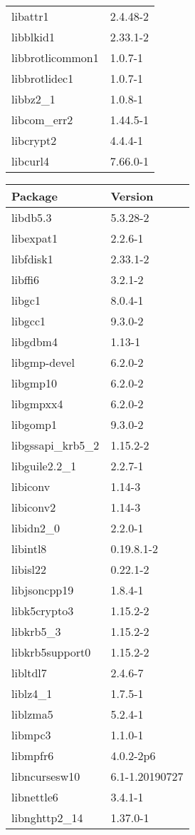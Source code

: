 \documentclass[10pt, english, openany]{report}
\begin{document}
\begin{appendices}
\begin{center}
\begin{tabular}{|m{4cm}|m{4cm}|}
libattr1 & 2.4.48-2 \\
libblkid1 & 2.33.1-2 \\
libbrotlicommon1 & 1.0.7-1 \\
libbrotlidec1 & 1.0.7-1 \\
libbz2\_1 & 1.0.8-1 \\
libcom\_err2 & 1.44.5-1 \\
libcrypt2 & 4.4.4-1 \\
libcurl4 & 7.66.0-1 \\
\hline
\end{tabular}
\begin{tabular}{|m{3cm}|m{3cm}|}
Package & Version \\
\hline
libdb5.3 & 5.3.28-2 \\
libexpat1 & 2.2.6-1 \\
libfdisk1 & 2.33.1-2 \\
libffi6 & 3.2.1-2 \\
libgc1 & 8.0.4-1 \\
libgcc1 & 9.3.0-2 \\
libgdbm4 & 1.13-1 \\
libgmp-devel & 6.2.0-2 \\
libgmp10 & 6.2.0-2 \\
libgmpxx4 & 6.2.0-2 \\
libgomp1 & 9.3.0-2 \\
libgssapi\_krb5\_2 & 1.15.2-2 \\
libguile2.2\_1 & 2.2.7-1 \\
libiconv & 1.14-3 \\
libiconv2 & 1.14-3 \\
libidn2\_0 & 2.2.0-1 \\
libintl8 & 0.19.8.1-2 \\
libisl22 & 0.22.1-2 \\
libjsoncpp19 & 1.8.4-1 \\
libk5crypto3 & 1.15.2-2 \\
libkrb5\_3 & 1.15.2-2 \\
libkrb5support0 & 1.15.2-2 \\
libltdl7 & 2.4.6-7 \\
liblz4\_1 & 1.7.5-1 \\
liblzma5 & 5.2.4-1 \\
libmpc3 & 1.1.0-1 \\
libmpfr6 & 4.0.2-2p6 \\
libncursesw10 & 6.1-1.20190727 \\
libnettle6 & 3.4.1-1 \\
libnghttp2\_14 & 1.37.0-1 \\

\end{tabular}
\end{center}
\end{appendices}
\end{document}
